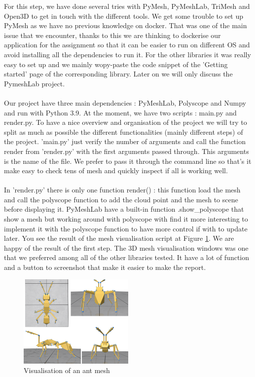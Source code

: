 \documentclass[10pt,twocolumn,letterpaper]{article}
\begin{document}
	For this step, we have done several tries with PyMesh, PyMeshLab, TriMesh and Open3D to get in touch with the different tools. We get some trouble to set up PyMesh as we have no previous knowledge on docker. That was one of the main issue that we encounter, thanks to this we are thinking to dockerise our application for the assignment so that it can be easier to run on different OS and avoid installing all the dependencies to run it. For the other libraries it was really easy to set up and we mainly wopy-paste the code snippet of the 'Getting started' page of the corresponding library.  Later on  we will only discuss the PymeshLab project. \\ \\
	Our project have three main dependencies : PyMeshLab, Polyscope and Numpy and run with Python 3.9. At the moment, we have two scripts : main.py and render.py. To have a nice overview and organisation of  the project we will try to split as much as possible the different functionalities (mainly different steps) of the project. 'main.py' just verify the number of arguments and call the function render from 'render.py' with the first arguments passed through. This arguments is the name of the file. We prefer to pass it through the command line so that's it make easy to check tens of mesh and quickly inspect if all is working well. \\ \\
	In 'render.py' there is only one function render() : this function load the mesh and call the polyscope function to add the cloud point and the mesh to scene before displaying it. PyMeshLab have a built-in function .show\_polyscope that show a mesh but working around with polyscope with find it more interesting to implement it with the polyscope function to have more control if with to update later. You see the result of the mesh visualisation script at Figure \ref{fig:ant-mesh}. We are happy of the result of the first step. The 3D mesh visualisation windows was one that we preferred among all of the other libraries tested. It have a lot of function and a button to screenshot that make it easier to make the report.
\begin{figure}
\begin{center}
  \includegraphics[width=0.5\textwidth]{ant}
  \caption{Visualisation of an ant mesh}
  \label{fig:ant-mesh}
  \end{center}
\end{figure}
\medskip
\printbibliography
\end{document}
